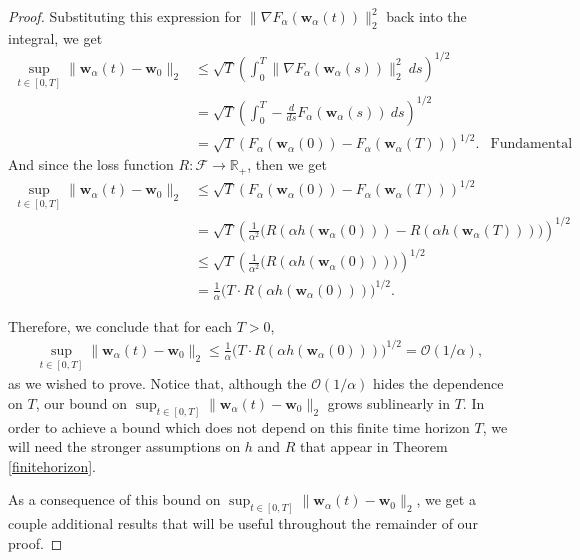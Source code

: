 \documentclass{article}
\begin{document}
\begin{proof}
Substituting this expression for $\| \nabla F_{\alpha}(\boldsymbol{w}_{\alpha}(t))\|_2^2$ back into the integral, we get
\begin{align*}
    \sup_{t \in [0, T]} \|\boldsymbol{w}_{\alpha}(t) - \boldsymbol{w}_0 \|_2 &\leq \sqrt{T} \left( \int_0^T \| \nabla F_{\alpha}(\boldsymbol{w}_{\alpha}(s)) \|_2^2 \ ds \right)^{1/2}\\
    &= \sqrt{T} \left( \int_0^T -\frac{d}{ds}F_{\alpha}(\boldsymbol{w}_{\alpha}(s)) \ ds \right)^{1/2}\\
    &= \sqrt{T} \left(  F_{\alpha}(\boldsymbol{w}_{\alpha}(0)) - F_{\alpha}(\boldsymbol{w}_{\alpha}(T)) \right)^{1/2}. & \text{Fundamental Theorem of Calculus}
\end{align*}
And since the loss function $R: \mathcal{F} \rightarrow \mathbb{R}_+$, then we get
\begin{align*}
    \sup_{t \in [0, T]} \|\boldsymbol{w}_{\alpha}(t) - \boldsymbol{w}_0 \|_2 &\leq \sqrt{T} \left(  F_{\alpha}(\boldsymbol{w}_{\alpha}(0)) - F_{\alpha}(\boldsymbol{w}_{\alpha}(T)) \right)^{1/2}\\
    &= \sqrt{T} \left( \frac{1}{\alpha^2} \bigg( R(\alpha h(\boldsymbol{w}_{\alpha}(0))) - R(\alpha h(\boldsymbol{w}_{\alpha}(T))) \bigg) \right)^{1/2}\\
    &\leq \sqrt{T} \left( \frac{1}{\alpha^2} \bigg( R(\alpha h(\boldsymbol{w}_{\alpha}(0))) \bigg) \right)^{1/2}\\
    &= \frac{1}{\alpha} \bigg(T \cdot R(\alpha h(\boldsymbol{w}_{\alpha}(0))) \bigg)^{1/2}.
\end{align*}

Therefore, we conclude that for each $T > 0$,
\begin{align*}
    \sup_{t \in [0, T]} \|\boldsymbol{w}_{\alpha}(t) - \boldsymbol{w}_0 \|_2 \leq \frac{1}{\alpha} \bigg(T \cdot R(\alpha h(\boldsymbol{w}_{\alpha}(0))) \bigg)^{1/2} = \mathcal{O}(1/\alpha),
\end{align*}
as we wished to prove. Notice that, although the $\mathcal{O}(1/\alpha)$ hides the dependence on $T$, our bound on $\sup_{t \in [0, T]} \|\boldsymbol{w}_{\alpha}(t) - \boldsymbol{w}_0 \|_2$ grows sublinearly in $T$. In order to achieve a bound which does not depend on this finite time horizon $T$, we will need the stronger assumptions on $h$ and $R$ that appear in Theorem \ref{finitehorizon}.

As a consequence of this bound on $ \sup_{t \in [0, T]} \|\boldsymbol{w}_{\alpha}(t) - \boldsymbol{w}_0 \|_2$, we get a couple additional results that will be useful throughout the remainder of our proof.


\end{proof}
\end{document}
